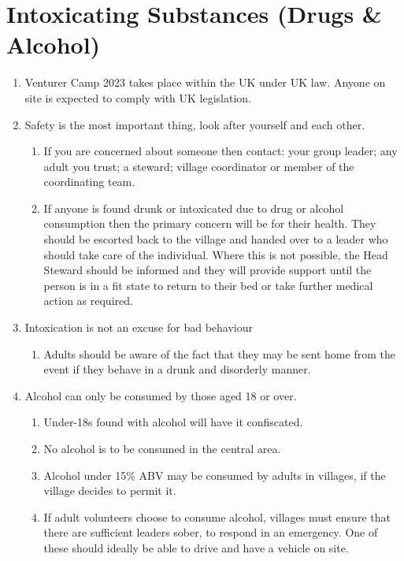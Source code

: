 \documentclass[a4paper, 11pt]{report}
\def\enumMarginIndentOne{4em}
\begin{document}
    \chapter{Intoxicating Substances (Drugs \& Alcohol)}
    \begin{enumerate}
        \item Venturer Camp 2023 takes place within the UK under UK law. Anyone on site is expected to comply with UK legislation.
        \item Safety is the most important thing, look after yourself and each other.
        \begin{enumerate}[leftmargin=\enumMarginIndentOne]
            \item If you are concerned about someone then contact:  your group leader; any adult you trust; a steward; village coordinator or member of the coordinating team.
            \item If anyone is found drunk or intoxicated due to drug or alcohol consumption then the primary concern will be for their health. They should be escorted back to the village and handed over to a leader who should take care of the individual. Where this is not possible, the Head Steward should be informed and they will provide support until the person is in a fit state to return to their bed or take further medical action as required.
        \end{enumerate}
        \item Intoxication is not an excuse for bad behaviour
        \begin{enumerate}[leftmargin=\enumMarginIndentOne]
            \item Adults should be aware of the fact that they may be sent home from the event if they behave in a drunk and disorderly manner. 
        \end{enumerate}
        \item Alcohol can only be consumed by those aged 18 or over.
        \begin{enumerate}[leftmargin=\enumMarginIndentOne]
            \item Under-18s found with alcohol will have it confiscated. 
            \item No alcohol is to be consumed in the central area.
            \item Alcohol under 15\% ABV may be consumed by adults in villages, if the village decides to permit it.
            \item If adult volunteers choose to consume alcohol, villages must ensure that there are sufficient leaders sober, to respond in an emergency. One of these should ideally be able to drive and have a vehicle on site.

\end{enumerate}
\end{enumerate}
\end{document}
